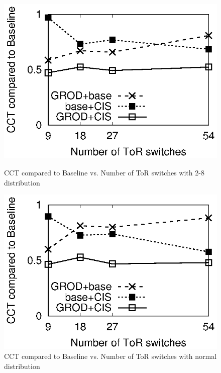 \begin{figure}
\begin{minipage}[c]{0.23\textwidth}
\includegraphics[width=1\textwidth]{28_count_cct.eps}
\caption{CCT compared to Baseline vs. Number of ToR switches with 2-8 distribution}\label{fig:28_count_cct}
\end{minipage}
\hspace{1mm}
\begin{minipage}[c]{0.23\textwidth}
\centering

\includegraphics[width=1\textwidth]{normal_count_cct.eps}
\caption{CCT compared to Baseline vs. Number of ToR switches with normal distribution}\label{fig:normal_count_cct}
\end{minipage}
\hspace{1mm}
\begin{minipage}[c]{0.23\textwidth}
\centering


\end{minipage}
\end{figure}
